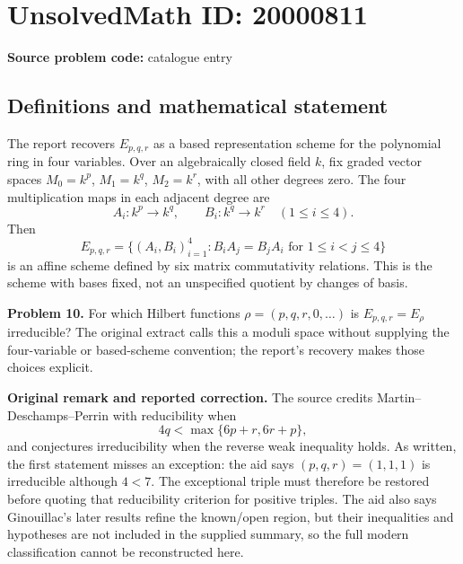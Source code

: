 \documentclass[11pt]{article}
\begin{document}
\section*{UnsolvedMath ID: 20000811}
\textbf{Source problem code:} catalogue entry
\subsection{Definitions and mathematical statement}
The report recovers $E_{p,q,r}$ as a based representation scheme for the polynomial ring in four variables. Over an algebraically closed field $k$, fix graded vector spaces $M_0=k^p$, $M_1=k^q$, $M_2=k^r$, with all other degrees zero. The four multiplication maps in each adjacent degree are
\[
 A_i:k^p\to k^q,\qquad B_i:k^q\to k^r\quad(1\leq i\leq4).
\]
Then
\[
 E_{p,q,r}=\{(A_i,B_i)_{i=1}^4:B_iA_j=B_jA_i\text{ for }1\leq i<j\leq4\}
\]
is an affine scheme defined by six matrix commutativity relations. This is the scheme with bases fixed, not an unspecified quotient by changes of basis.

\textbf{Problem 10.} For which Hilbert functions $\rho=(p,q,r,0,\ldots)$ is $E_{p,q,r}=E_\rho$ irreducible? The original extract calls this a moduli space without supplying the four-variable or based-scheme convention; the report's recovery makes those choices explicit.

\textbf{Original remark and reported correction.} The source credits Martin--Deschamps--Perrin with reducibility when
\[
 4q<\max\{6p+r,6r+p\},
\]
and conjectures irreducibility when the reverse weak inequality holds. As written, the first statement misses an exception: the aid says $(p,q,r)=(1,1,1)$ is irreducible although $4<7$. The exceptional triple must therefore be restored before quoting that reducibility criterion for positive triples. The aid also says Ginouillac's later results refine the known/open region, but their inequalities and hypotheses are not included in the supplied summary, so the full modern classification cannot be reconstructed here.
\end{document}

